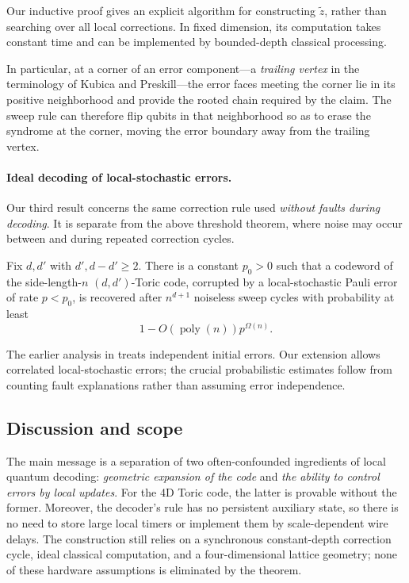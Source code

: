 Our inductive proof gives an explicit algorithm for constructing $\tilde z$, rather than searching over all local corrections. In fixed dimension, its computation takes constant time and can be implemented by bounded-depth classical processing.

In particular, at a corner of an error component---a \emph{trailing vertex} in the terminology of Kubica and Preskill---the error faces meeting the corner lie in its positive neighborhood and provide the rooted chain required by the claim. The sweep rule can therefore flip qubits in that neighborhood so as to erase the syndrome at the corner, moving the error boundary away from the trailing vertex.
\paragraph{Ideal decoding of local-stochastic errors.}
Our third result concerns the same correction rule used \emph{without faults during decoding}. It is separate from the above threshold theorem, where noise may occur between and during repeated correction cycles.

\begin{theorem*}
Fix $d,d'$ with $d',d-d'\geq2$. There is a constant $p_0>0$ such that a codeword of the side-length-$n$ $(d,d')$-Toric code, corrupted by a local-stochastic Pauli error of rate $p<p_0$, is recovered after $n^{d+1}$ noiseless sweep cycles with probability at least
\begin{equation*}
  1-O\!\left(\operatorname{poly}(n)\right)p^{\Omega(n)}.
\end{equation*}
\end{theorem*}

The earlier analysis in \cite{Kubica_2019} treats independent initial errors. Our extension allows correlated local-stochastic errors; the crucial probabilistic estimates follow from counting fault explanations rather than assuming error independence.

\subsection{Discussion and scope}

The main message is a separation of two often-confounded ingredients of local quantum decoding: \emph{geometric expansion of the code} and \emph{the ability to control errors by local updates}. For the 4D Toric code, the latter is provable without the former. Moreover, the decoder's rule has no persistent auxiliary state, so there is no need to store large local timers or implement them by scale-dependent wire delays. The construction still relies on a synchronous constant-depth correction cycle, ideal classical computation, and a four-dimensional lattice geometry; none of these hardware assumptions is eliminated by the theorem.

